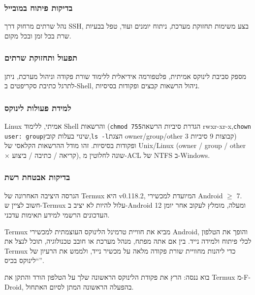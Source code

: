
\subsubsection*{בדיקות פיתוח במובייל}

נהל שרתים מרחוק דרך SSH, בצע משימות תחזוקת מערכת, ניתוח יומנים ועוד, טפל בבעיות שרת בכל זמן ובכל מקום.

\subsubsection*{תפעול ותחזוקת שרתים}

מספק סביבת לינוקס אמיתית, פלטפורמה אידיאלית ללימוד שורת פקודה וניהול מערכת, ניתן לתרגל כתיבת סקריפטים ב-Shell, ניהול הרשאות קבצים ופקודות בסיסיות.

\subsubsection*{למידת פעולות לינוקס}

Linux אמיתי, ללימוד Shell והרשאות (\texttt{chmod 755}הגדרת סיביות הרשאה rwxr-xr-x,\texttt{chown user: group}שינוי בעלות קובץ,\texttt{ls -\allowbreak l}הצגת owner/group/other 3 קבוצות 9 סיביות) ופקודות בסיסיות. זהו מודל ההרשאות הקלאסי של Unix/Linux (owner / group / other × קריאה / כתיבה / ביצוע), שונה לחלוטין מ-ACL של NTFS ב-Windows.

\subsubsection*{בדיקות אבטחת רשת}

הגרסה היציבה האחרונה של Termux היא v0.118.2, המיועדת למכשירי Android $\geq$ 7. חשוב לציין ש-Termux עלול להיות לא יציב ב-Android 12 ומעלה, מומלץ לעקוב אחר יומן העדכונים הרשמי למידע תאימות עדכני.


Termux מביא את חוויית טרמינל הלינוקס העוצמתית למכשירי Android, והופך את הטלפון לכלי פיתוח ולמידה נייד. בין אם אתה מפתח, מנהל מערכת או חובב טכנולוגיה, תוכל לנצל את Termux כדי ליהנות מחוויית שורת פקודה מלאה על מכשיר נייד, ולממש את הרעיון של “לינוקס בכיס”.

\begin{tcbinfo}{בוא ננסה: הרץ את פקודת הלינוקס הראשונה שלך על הטלפון}
הורד והתקן את Termux מ-F-Droid, בהפעלה הראשונה המתן לסיום האתחול.

\end{tcbinfo}

